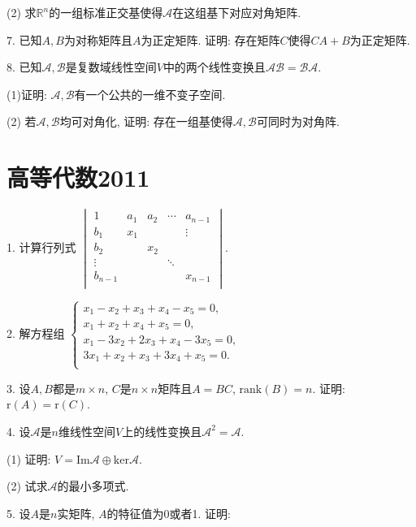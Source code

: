 \documentclass[12pt, a4paper, twoside]{ctexart}%
\begin{document}
	\hspace{1.2em}(2) 求$\mathbb{R}^n$的一组标准正交基使得$\mathscr{A}$在这组基下对应对角矩阵. \par
	7. 已知$A,B$为对称矩阵且$A$为正定矩阵. 证明: 存在矩阵$C$使得$CA+B$为正定矩阵.\par
	8. 已知$\mathscr{A},\mathscr{B}$是复数域线性空间$V$中的两个线性变换且$\mathscr{AB}=\mathscr{BA}$. \par 
	\hspace{1.2em}(1)证明: $\mathscr{A},\mathscr{B}$有一个公共的一维不变子空间. \par
	\hspace{1.2em}(2) 若$\mathscr{A},\mathscr{B}$均可对角化, 证明: 存在一组基使得$\mathscr{A},\mathscr{B}$可同时为对角阵. \par
	
	\clearpage
	\section{高等代数2011}
	1. 计算行列式 $\begin{vmatrix}
		1 & a_1&a_2 &\cdots & a_{n-1}\\
		b_1 & x_1& & &\vdots \\
		b_2& & x_2& & \\
		\vdots& & & \ddots& \\
		b_{n-1}& & & &x_{n-1}\\
	\end{vmatrix}$.\par
	2. 解方程组 $\begin{cases}
		x_1-x_2+x_3+x_4-x_5=0,\\
		x_1+x_2+x_4+x_5=0,\\
		x_1-3x_2+2x_3+x_4-3x_5=0,\\
		3x_1+x_2+x_3+3x_4+x_5=0.\\
	\end{cases}$ \par 
	3. 设$A,B$都是$m\times n$, $C$是$n\times n$矩阵且$A=BC$, $\mathrm{rank}(B)=n$. 证明: $\mathrm{r}(A)=\mathrm{r}(C)$.\par 
	4. 设$\mathscr{A}$是$n$维线性空间$V$上的线性变换且$\mathscr{A}^2=\mathscr{A}$.\par 
	\hspace{1.2em}(1) 证明: $V=\mathrm{Im}\mathscr{A}\oplus\mathrm{ker}\mathscr{A}$.\par 
	\hspace{1.2em}(2) 试求$\mathscr{A}$的最小多项式.\par
	5. 设$A$是$n$实矩阵, $A$的特征值为0或者1. 证明: \par
\end{document}

